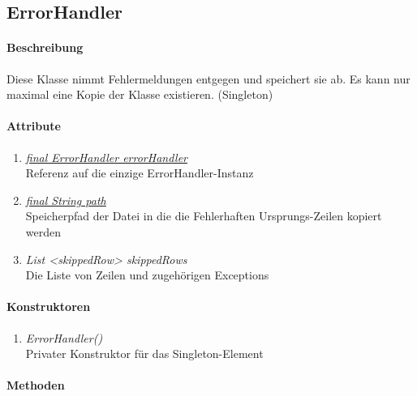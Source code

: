 \subsection*{ErrorHandler}\label{error}

\paragraph{Beschreibung}
Diese Klasse nimmt Fehlermeldungen entgegen und speichert sie ab. Es kann nur maximal eine Kopie der Klasse existieren. (Singleton)

\paragraph{Attribute}

\begin{enumerate}[$\bullet$]
	\item \underline{\textit{final ErrorHandler errorHandler}} \\
	Referenz auf die einzige ErrorHandler-Instanz
	\item \underline{\textit{final String path}} \\
	Speicherpfad der Datei in die die Fehlerhaften Ursprungs-Zeilen kopiert werden
	\item \textit{List <skippedRow> skippedRows} \\
	Die Liste von Zeilen und zugehörigen Exceptions
\end{enumerate}

\paragraph{Konstruktoren}
\begin{enumerate}[-]
	\item \textit{ErrorHandler()} \\
	Privater Konstruktor für das Singleton-Element
\end{enumerate}

\paragraph{Methoden}

